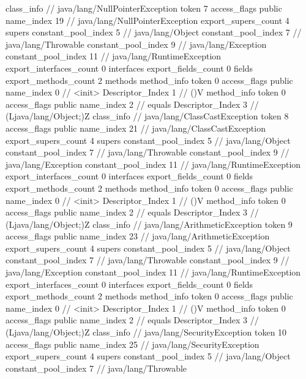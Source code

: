 {{		class_info {		// java/lang/NullPointerException
			token	7
			access_flags	public
			name_index	19		// java/lang/NullPointerException
			export_supers_count	4
			supers {
				constant_pool_index	5		// java/lang/Object
				constant_pool_index	7		// java/lang/Throwable
				constant_pool_index	9		// java/lang/Exception
				constant_pool_index	11		// java/lang/RuntimeException
			}
			export_interfaces_count	0
			interfaces {
			}
			export_fields_count	0
			fields {
			}
			export_methods_count	2
			methods {
				method_info {
					token	0
					access_flags	public
					name_index	0		// <init>
					Descriptor_Index	1		// ()V
				}
				method_info {
					token	0
					access_flags	public
					name_index	2		// equals
					Descriptor_Index	3		// (Ljava/lang/Object;)Z
				}
			}
		}
		class_info {		// java/lang/ClassCastException
			token	8
			access_flags	public
			name_index	21		// java/lang/ClassCastException
			export_supers_count	4
			supers {
				constant_pool_index	5		// java/lang/Object
				constant_pool_index	7		// java/lang/Throwable
				constant_pool_index	9		// java/lang/Exception
				constant_pool_index	11		// java/lang/RuntimeException
			}
			export_interfaces_count	0
			interfaces {
			}
			export_fields_count	0
			fields {
			}
			export_methods_count	2
			methods {
				method_info {
					token	0
					access_flags	public
					name_index	0		// <init>
					Descriptor_Index	1		// ()V
				}
				method_info {
					token	0
					access_flags	public
					name_index	2		// equals
					Descriptor_Index	3		// (Ljava/lang/Object;)Z
				}
			}
		}
		class_info {		// java/lang/ArithmeticException
			token	9
			access_flags	public
			name_index	23		// java/lang/ArithmeticException
			export_supers_count	4
			supers {
				constant_pool_index	5		// java/lang/Object
				constant_pool_index	7		// java/lang/Throwable
				constant_pool_index	9		// java/lang/Exception
				constant_pool_index	11		// java/lang/RuntimeException
			}
			export_interfaces_count	0
			interfaces {
			}
			export_fields_count	0
			fields {
			}
			export_methods_count	2
			methods {
				method_info {
					token	0
					access_flags	public
					name_index	0		// <init>
					Descriptor_Index	1		// ()V
				}
				method_info {
					token	0
					access_flags	public
					name_index	2		// equals
					Descriptor_Index	3		// (Ljava/lang/Object;)Z
				}
			}
		}
		class_info {		// java/lang/SecurityException
			token	10
			access_flags	public
			name_index	25		// java/lang/SecurityException
			export_supers_count	4
			supers {
				constant_pool_index	5		// java/lang/Object
				constant_pool_index	7		// java/lang/Throwable
}}}}
